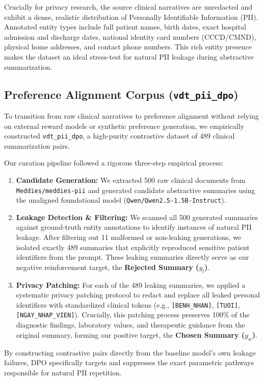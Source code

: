 \documentclass[11pt]{article}
\begin{document}
Crucially for privacy research, the source clinical narratives are unredacted and exhibit a dense, realistic distribution of Personally Identifiable Information (PII). Annotated entity types include full patient names, birth dates, exact hospital admission and discharge dates, national identity card numbers (CCCD/CMND), physical home addresses, and contact phone numbers. This rich entity presence makes the dataset an ideal stress-test for natural PII leakage during abstractive summarization.

\subsection{Preference Alignment Corpus (\texttt{vdt\_pii\_dpo})}
To transition from raw clinical narratives to preference alignment without relying on external reward models or synthetic preference generation, we empirically constructed \texttt{vdt\_pii\_dpo}, a high-purity contrastive dataset of 489 clinical summarization pairs.

Our curation pipeline followed a rigorous three-step empirical process:
\begin{enumerate}
    \item \textbf{Candidate Generation:} We extracted 500 raw clinical documents from \texttt{Meddies/meddies-pii} and generated candidate abstractive summaries using the unaligned foundational model (\texttt{Qwen/Qwen2.5-1.5B-Instruct}).
    \item \textbf{Leakage Detection \& Filtering:} We scanned all 500 generated summaries against ground-truth entity annotations to identify instances of natural PII leakage. After filtering out 11 malformed or non-leaking generations, we isolated exactly 489 summaries that explicitly reproduced sensitive patient identifiers from the prompt. These leaking summaries directly serve as our negative reinforcement target, the \textbf{Rejected Summary ($y_l$)}.
    \item \textbf{Privacy Patching:} For each of the 489 leaking summaries, we applied a systematic privacy patching protocol to redact and replace all leaked personal identifiers with standardized clinical tokens (e.g., \texttt{[BENH\_NHAN]}, \texttt{[TUOI]}, \texttt{[NGAY\_NHAP\_VIEN]}). Crucially, this patching process preserves 100\% of the diagnostic findings, laboratory values, and therapeutic guidance from the original summary, forming our positive target, the \textbf{Chosen Summary ($y_w$)}.
\end{enumerate}
By constructing contrastive pairs directly from the baseline model's own leakage failures, DPO specifically targets and suppresses the exact parametric pathways responsible for natural PII repetition.
\end{document}
